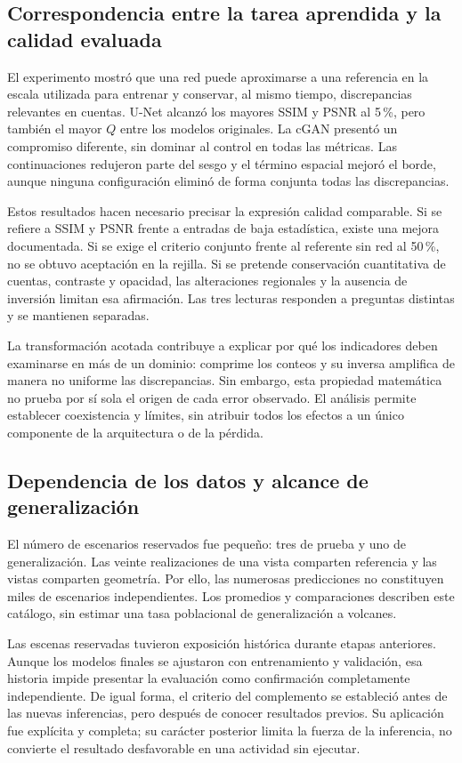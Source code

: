 \subsection{Correspondencia entre la tarea aprendida y la calidad evaluada}
El experimento mostró que una red puede aproximarse a una referencia en la escala utilizada para entrenar y conservar, al mismo tiempo, discrepancias relevantes en cuentas. U-Net alcanzó los mayores SSIM y PSNR al 5\,\%, pero también el mayor $Q$ entre los modelos originales. La cGAN presentó un compromiso diferente, sin dominar al control en todas las métricas. Las continuaciones redujeron parte del sesgo y el término espacial mejoró el borde, aunque ninguna configuración eliminó de forma conjunta todas las discrepancias.

Estos resultados hacen necesario precisar la expresión calidad comparable. Si se refiere a SSIM y PSNR frente a entradas de baja estadística, existe una mejora documentada. Si se exige el criterio conjunto frente al referente sin red al 50\,\%, no se obtuvo aceptación en la rejilla. Si se pretende conservación cuantitativa de cuentas, contraste y opacidad, las alteraciones regionales y la ausencia de inversión limitan esa afirmación. Las tres lecturas responden a preguntas distintas y se mantienen separadas.

La transformación acotada contribuye a explicar por qué los indicadores deben examinarse en más de un dominio: comprime los conteos y su inversa amplifica de manera no uniforme las discrepancias. Sin embargo, esta propiedad matemática no prueba por sí sola el origen de cada error observado. El análisis permite establecer coexistencia y límites, sin atribuir todos los efectos a un único componente de la arquitectura o de la pérdida.

\subsection{Dependencia de los datos y alcance de generalización}
El número de escenarios reservados fue pequeño: tres de prueba y uno de generalización. Las veinte realizaciones de una vista comparten referencia y las vistas comparten geometría. Por ello, las numerosas predicciones no constituyen miles de escenarios independientes. Los promedios y comparaciones describen este catálogo, sin estimar una tasa poblacional de generalización a volcanes.

Las escenas reservadas tuvieron exposición histórica durante etapas anteriores. Aunque los modelos finales se ajustaron con entrenamiento y validación, esa historia impide presentar la evaluación como confirmación completamente independiente. De igual forma, el criterio del complemento se estableció antes de las nuevas inferencias, pero después de conocer resultados previos. Su aplicación fue explícita y completa; su carácter posterior limita la fuerza de la inferencia, no convierte el resultado desfavorable en una actividad sin ejecutar.

